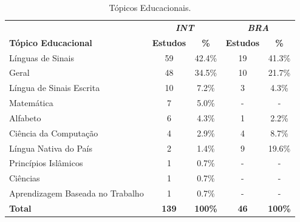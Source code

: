 \begin{table}[htbp]
\caption{Tópicos Educacionais.}
\label{results:table:educational-topics}
\centering
\begin{tabular}{lcccc}
\hline
                                 & \multicolumn{2}{c}{\textit{\textbf{INT}}} & \multicolumn{2}{c}{\textit{\textbf{BRA}}} \\ \cline{2-5} 
\textbf{Tópico Educacional}      & \textbf{Estudos}      & \textbf{\%}        & \textbf{Estudos}      & \textbf{\%}        \\ \hline
Línguas de Sinais                & 59                    & 42.4\%             & 19                    & 41.3\%             \\ 
Geral                            & 48                    & 34.5\%             & 10                    & 21.7\%             \\ 
Língua de Sinais Escrita         & 10                    & 7.2\%              & 3                     & 4.3\%              \\ 
Matemática                       & 7                     & 5.0\%              & -                     & -                  \\ 
Alfabeto                         & 6                     & 4.3\%              & 1                     & 2.2\%              \\ 
Ciência da Computação            & 4                     & 2.9\%              & 4                     & 8.7\%              \\ 
Língua Nativa do País            & 2                     & 1.4\%              & 9                     & 19.6\%             \\ 
Princípios Islâmicos             & 1                     & 0.7\%              & -                     & -                  \\ 
Ciências                         & 1                     & 0.7\%              & -                     & -                  \\ 
Aprendizagem Baseada no Trabalho & 1                     & 0.7\%              & -                     & -                  \\ 
\textbf{Total}                   & \textbf{139}          & \textbf{100\%}     & \textbf{46}           & \textbf{100\%}     \\ \hline
\end{tabular}
\fautor
\end{table}

